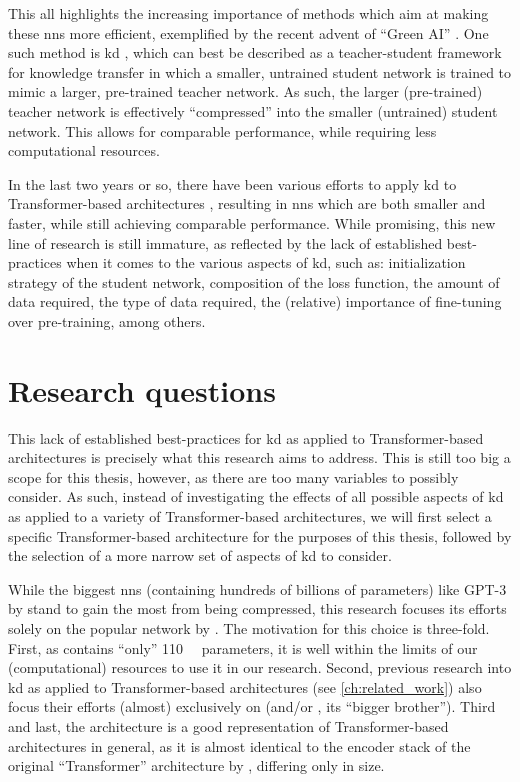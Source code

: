This all highlights the increasing importance of methods which aim at making these \glspl{nn} more efficient, exemplified by the recent advent of ``Green AI'' \citep{schwartz2019green}. One such method is \gls{kd} \citep{bucil2006model,hinton2015distilling}, which can best be described as a teacher-student framework for knowledge transfer in which a smaller, untrained student network is trained to mimic a larger, pre-trained teacher network. As such, the larger (pre-trained) teacher network is effectively ``compressed'' into the smaller (untrained) student network. This allows for comparable performance, while requiring less computational resources.

In the last two years or so, there have been various efforts to apply \gls{kd} to Transformer-based architectures \citep{sun2019patient,jiao2019tinybert,sanh2019distilbert,turc2019well}, resulting in \glspl{nn} which are both smaller and faster, while still achieving comparable performance. While promising, this new line of research is still immature, as reflected by the lack of established best-practices when it comes to the various aspects of \gls{kd}, such as: initialization strategy of the student network, composition of the loss function, the amount of data required, the type of data required, the (relative) importance of fine-tuning over pre-training, among others.

\section{Research questions}
\label{sec:research_questions}
This lack of established best-practices for \gls{kd} as applied to Transformer-based architectures is precisely what this research aims to address. This is still too big a scope for this thesis, however, as there are too many variables to possibly consider. As such, instead of investigating the effects of all possible aspects of \gls{kd} as applied to a variety of Transformer-based architectures, we will first select a specific Transformer-based architecture for the purposes of this thesis, followed by the selection of a more narrow set of aspects of \gls{kd} to consider.

While the biggest \glspl{nn} (containing hundreds of billions of parameters) like GPT-3 by \citet{brown2020language} stand to gain the most from being compressed, this research focuses its efforts solely on the popular \bertbase network by \citet{devlin2018bert}. The motivation for this choice is three-fold. First, as \bertbase contains ``only'' \SI{110}{\mega\nothing} parameters, it is well within the limits of our (computational) resources to use it in our research. Second, previous research into \gls{kd} as applied to Transformer-based architectures (see \cref{ch:related_work}) also focus their efforts (almost) exclusively on \bertbase (and/or \bertlarge, its ``bigger brother''). Third and last, the \bertbase architecture is a good representation of Transformer-based architectures in general, as it is almost identical to the encoder stack of the original ``Transformer'' architecture by \citet{vaswani2017attention}, differing only in size.

